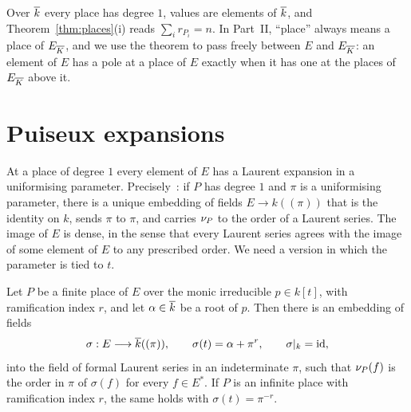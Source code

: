Over $\overline{k}$ every place has degree $1$, values are elements of $\overline{k}$, and
Theorem~\ref{thm:places}(i) reads $\sum_i r_{P_i} = n$. In Part~II, ``place''
always means a place of $E_{\overline{K}}$, and we use the theorem to pass freely
between $E$ and $E_{\overline{K}}$: an element of $E$ has a pole at a place of $E$
exactly when it has one at the places of $E_{\overline{K}}$ above it.

\section{Puiseux expansions}\label{sec:ff-puiseux}

At a place of degree $1$ every element of $E$ has a Laurent expansion in a
uniformising parameter. Precisely~\cite[Theorem~4.2.6]{stichtenoth2009}: if
$P$ has degree $1$ and $\pi$ is a uniformising parameter, there is a unique
embedding of fields $E \to k((\pi))$ that is the identity on $k$, sends $\pi$
to $\pi$, and carries $\nu_{P}$ to the order of a Laurent series. The image
of $E$ is dense, in the sense that every Laurent series agrees with the image
of some element of $E$ to any prescribed order. We need a version in which
the parameter is tied to $t$.

\begin{theorem}[Puiseux]\label{thm:puiseux}
Let $P$ be a finite place of $E$ over the monic irreducible $p \in k[t]$, with
ramification index $r$, and let $\alpha \in \overline{k}$ be a root of $p$. Then
there is an embedding of fields
\[
  \sigma : E \longrightarrow \overline{k}((\pi)), \qquad \sigma(t) = \alpha + \pi^r,
  \qquad \sigma|_k = \mathrm{id},
\]
into the field of formal Laurent series in an indeterminate $\pi$, such that
$\nu_{P}(f)$ is the order in $\pi$ of $\sigma(f)$ for every $f \in E^*$. If
$P$ is an infinite place with ramification index $r$, the same holds with
$\sigma(t) = \pi^{-r}$.
\end{theorem}

